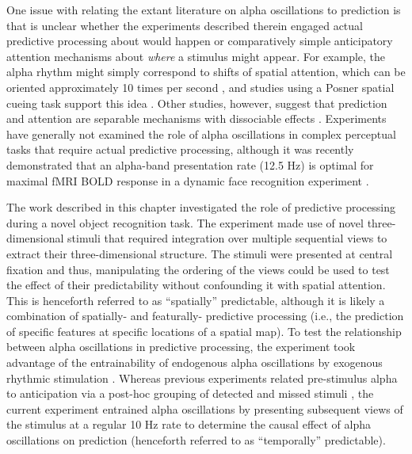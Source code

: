 \documentclass[dwyatte_dissertation.tex]{subfiles}
\begin{document}
One issue with relating the extant literature on alpha oscillations to prediction is that is unclear whether the experiments described therein engaged actual predictive processing about  would happen or comparatively simple anticipatory attention mechanisms about \textit{where} a stimulus might appear. For example, the alpha rhythm might simply correspond to shifts of spatial attention, which can be oriented approximately 10 times per second \cite{VanRullenDubois11}, and studies using a Posner spatial cueing task \cite{Posner80} support this idea \cite{CapotostoBabiloniRomaniEtAl09,BuschVanRullen10}. Other studies, however, suggest that prediction and attention are separable mechanisms with dissociable effects \cite{KokRahnevJeheeEtAl12,WyartNobreSummerfield12,HorschigJensenVanSchouwenburgEtAl13}. Experiments have generally not examined the role of alpha oscillations in complex perceptual tasks that require actual predictive processing, although it was recently demonstrated that an alpha-band presentation rate (12.5 Hz) is optimal for maximal fMRI BOLD response in a dynamic face recognition experiment \cite{SchultzBrockhausBulthoffEtAl13}.

The work described in this chapter investigated the role of predictive processing during a novel object recognition task. The experiment made use of novel three-dimensional stimuli that required integration over multiple sequential views to extract their three-dimensional structure. The stimuli were presented at central fixation and thus, manipulating the ordering of the views could be used to test the effect of their predictability without confounding it with spatial attention. This is henceforth referred to as ``spatially'' predictable, although it is likely a combination of spatially- and featurally- predictive processing (i.e., the prediction of specific features at specific locations of a spatial map). To test the relationship between alpha oscillations in predictive processing, the experiment took advantage of the entrainability of endogenous alpha oscillations by exogenous rhythmic stimulation \cite{SchroederLakatosKajikawaEtAl08,CalderoneLakatosButlerEtAlInPress}. Whereas previous experiments related pre-stimulus alpha to  anticipation via a post-hoc grouping of detected and missed stimuli \cite{MathewsonGrattonFabianiEtAl09,BuschDuboisVanRullen09}, the current experiment entrained alpha oscillations by presenting subsequent views of the stimulus at a regular 10 Hz rate to determine the causal effect of alpha oscillations on prediction (henceforth referred to as ``temporally'' predictable).
\end{document}

